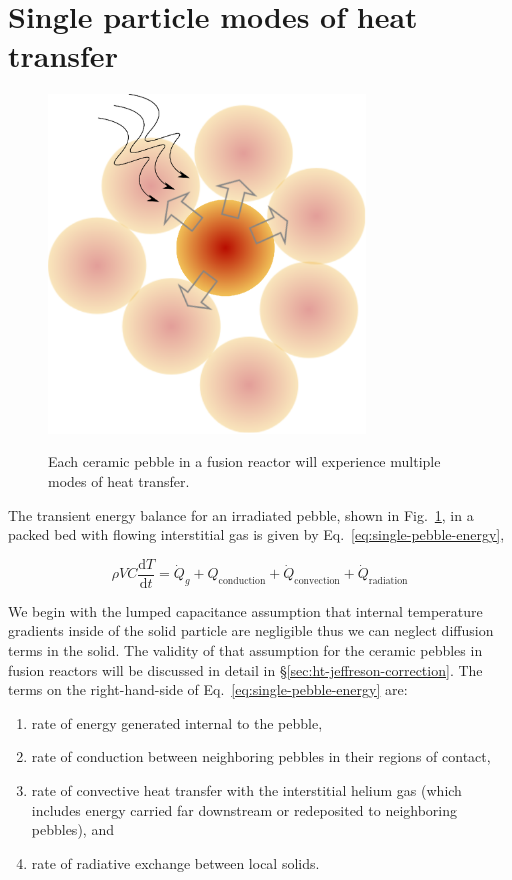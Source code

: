 \section{Single particle modes of heat transfer}

\begin{figure}[t]
	\centering
	\caption{Each ceramic pebble in a fusion reactor will experience multiple modes of heat transfer.}
	\includegraphics[width=0.75\textwidth]{chapters/figures/pebble-complete-heat-transfer}\label{fig:peb-comp-ht}
\end{figure}

The transient energy balance for an irradiated pebble, shown in Fig.~\ref{fig:peb-comp-ht}, in a packed bed with flowing interstitial gas is given by Eq.~\ref{eq:single-pebble-energy},

\begin{equation}\label{eq:single-pebble-energy}
	\rho V C \frac{\mathrm{d}T}{\mathrm{d}t} = \dot{Q}_g + Q_\text{conduction} + \dot{Q}_\text{convection} + \dot{Q}_\text{radiation}
\end{equation}

We begin with the lumped capacitance assumption that internal temperature gradients inside of the solid particle are negligible thus we can neglect diffusion terms in the solid. The validity of that assumption for the ceramic pebbles in fusion reactors will be discussed in detail in \S\ref{sec:ht-jeffreson-correction}. The terms on the right-hand-side of Eq.~\ref{eq:single-pebble-energy} are:

\begin{enumerate}
\item rate of energy generated internal to the pebble,
\item rate of conduction between neighboring pebbles in their regions of contact, 
\item rate of convective heat transfer with the interstitial helium gas (which includes energy carried far downstream or redeposited to neighboring pebbles), and
\item rate of radiative exchange between local solids.
\end{enumerate}

